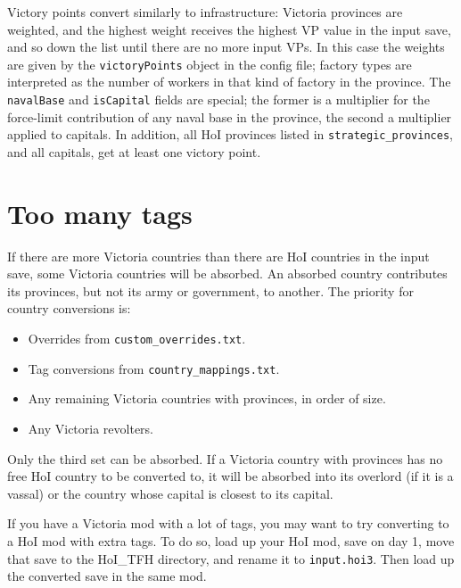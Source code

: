 \documentclass[12pt,ebook,oneside]{book}
\begin{document}
Victory points convert similarly to infrastructure: Victoria provinces
are weighted, and the highest weight receives the highest VP value in
the input save, and so down the list until there are no more input
VPs. In this case the weights are given by the \texttt{victoryPoints}
object in the config file; factory types are interpreted as the number
of workers in that kind of factory in the province. The
\texttt{navalBase} and \texttt{isCapital} fields are special; the
former is a multiplier for the force-limit contribution of any naval
base in the province, the second a multiplier applied to capitals. In addition,
all HoI provinces listed in \texttt{strategic\_provinces}, and all
capitals, get at least one victory point. 

\section{Too many tags}

If there are more Victoria countries than there are HoI countries in
the input save, some Victoria countries will be absorbed. An absorbed
country contributes its provinces, but not its army or government, to
another. The priority for country conversions is:
\begin{itemize}
\item Overrides from \texttt{custom\_overrides.txt}.
\item Tag conversions from \texttt{country\_mappings.txt}.
\item Any remaining Victoria countries with provinces, in order of
  size.
\item Any Victoria revolters.
\end{itemize}
Only the third set can be absorbed. If a Victoria country with
provinces has no free HoI country to be converted to, it will be
absorbed into its overlord (if it is a vassal) or the country whose
capital is closest to its capital. 

If you have a Victoria mod with a lot of tags, you may want to try
converting to a HoI mod with extra tags. To do so, load up your HoI
mod, save on day 1, move that save to the HoI\_TFH directory,
and rename it to \texttt{input.hoi3}. Then load up the converted save
in the same mod. 
\end{document}
